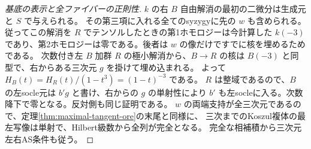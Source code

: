 \begin{proof}[基底の表示と全ファイバーの正則性]
$k$ の右 $B$ 自由解消の最初の二微分は生成元と $S$ で与えられる。
その第三項に入れる全てのsyzygyに先の $w$ も含められる。
従ってこの解消を $R$ でテンソルしたときの第1ホモロジーは今計算した
$k(-3)$ であり、第2ホモロジーは零である。後者は $w$ の像だけですでに核を埋めるためである。
次数付き左 $B$ 加群 $R$ の極小解消から、$B\to R$ の核は
$B(-3)$ と同型で、右からある三次元 $g$ を掛けて埋め込まれる。
よって $H_B(t)=H_R(t)/(1-t^3)=(1-t)^{-3}$ である。
$R$ は整域であるので、$B$ の左socle元は $b'g$ と書け、右からの $g$ の単射性により
$b'$ も左socleに入る。次数降下で零となる。反対側も同じ証明である。
$w$ の両端支持が全三次元であるので、定理\ref{thm:maximal-tangent-ore}の末尾と同様に、
三次までのKoszul複体の最左写像は単射で、Hilbert級数から全列が完全となる。
完全な相補積から三次元左右AS条件も従う。
\end{proof}

